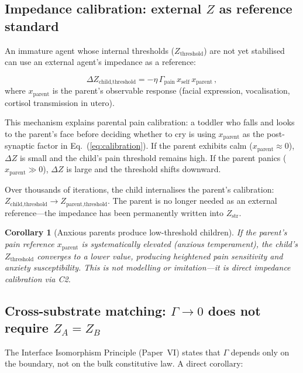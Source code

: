 \documentclass[aps,pre,twocolumn,superscriptaddress,floatfix]{revtex4-2}
\newtheorem{corollary}{Corollary}
\begin{document}
\subsection{Impedance calibration: external $Z$ as reference
  standard}
\label{sec:calibration}

An immature agent whose internal thresholds
($Z_{\text{threshold}}$) are not yet stabilised can use
an external agent's impedance as a reference:

\begin{equation}
  \Delta Z_{\text{child,threshold}} =
    -\eta\,\Gamma_{\text{pain}}\,x_{\text{self}}\,
    x_{\text{parent}}\,,
  \label{eq:calibration}
\end{equation}
where $x_{\text{parent}}$ is the parent's observable
response (facial expression, vocalisation, cortisol
transmission in utero).

This mechanism explains parental pain calibration:
a toddler who falls and looks to the parent's face before
deciding whether to cry is using $x_{\text{parent}}$ as
the post-synaptic factor in Eq.~(\ref{eq:calibration}).
If the parent exhibits calm ($x_{\text{parent}}\approx 0$),
$\Delta Z$ is small and the child's pain threshold remains
high.  If the parent panics ($x_{\text{parent}}\gg 0$),
$\Delta Z$ is large and the threshold shifts downward.

Over thousands of iterations, the child internalises the
parent's calibration:
$Z_{\text{child,threshold}}\to Z_{\text{parent,threshold}}$.
The parent is no longer needed as an external reference---the
impedance has been permanently written into
$Z_{\text{str}}$.

\begin{corollary}[Anxious parents produce low-threshold children]
If the parent's pain reference $x_{\text{parent}}$ is
systematically elevated (anxious temperament), the child's
$Z_{\text{threshold}}$ converges to a lower value,
producing heightened pain sensitivity and anxiety
susceptibility.  This is not modelling or imitation---it
is direct impedance calibration via C2.
\end{corollary}


\subsection{Cross-substrate matching: $\Gamma\to 0$ does not
  require $Z_A = Z_B$}
\label{sec:cross-substrate}

The Interface Isomorphism Principle (Paper~VI) states that
$\Gamma$ depends only on the boundary, not on the bulk
constitutive law.  A direct corollary:
\end{document}
